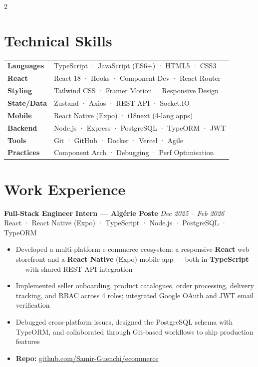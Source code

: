 \documentclass[8.5pt, letterpaper]{extarticle}
\newcommand{\role}[3]{%
  {\bfseries\small #1} \hfill {\small\color{muted}\textit{#2}}\\[-1pt]
  {\small\color{blue} #3}\vspace{2pt}%
}
\begin{document}
\begin{multicols}{2}
\RaggedRight

\section{Technical Skills}

\begin{tabular}{@{}ll}
\textbf{Languages}   & TypeScript · JavaScript (ES6+) · HTML5 · CSS3 \\
\textbf{React}       & React 18 · Hooks · Component Dev · React Router \\
\textbf{Styling}     & Tailwind CSS · Framer Motion · Responsive Design \\
\textbf{State/Data}  & Zustand · Axios · REST API · Socket.IO \\
\textbf{Mobile}      & React Native (Expo) · i18next (4-lang apps) \\
\textbf{Backend}     & Node.js · Express · PostgreSQL · TypeORM · JWT \\
\textbf{Tools}       & Git · GitHub · Docker · Vercel · Agile \\
\textbf{Practices}   & Component Arch · Debugging · Perf Optimisation \\
\end{tabular}

\vspace{4pt}

\section{Work Experience}

\role{Full-Stack Engineer Intern — Algérie Poste}{Dec 2025 – Feb 2026}{React · React Native (Expo) · TypeScript · Node.js · PostgreSQL · TypeORM}
\begin{itemize}
  \item Developed a multi-platform e-commerce ecosystem: a responsive \textbf{React} web storefront and a \textbf{React Native} (Expo) mobile app — both in \textbf{TypeScript} — with shared REST API integration
  \item Implemented seller onboarding, product catalogues, order processing, delivery tracking, and RBAC across 4 roles; integrated Google OAuth and JWT email verification
  \item Debugged cross-platform issues, designed the PostgreSQL schema with TypeORM, and collaborated through Git-based workflows to ship production features
  \item \textbf{Repo:} \href{https://github.com/Samir-Guenchi/ecommerce}{\color{blue}github.com/Samir-Guenchi/ecommerce}
\end{itemize}
\vspace{3pt}


\end{multicols}
\end{document}
